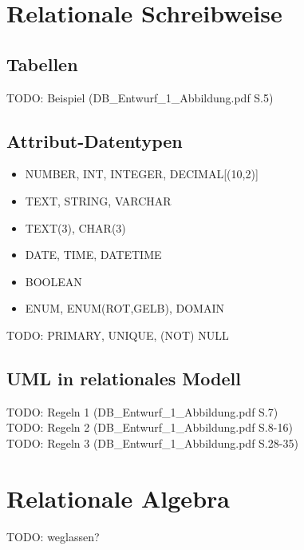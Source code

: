 \section{Relationale Schreibweise}
\subsection{Tabellen}
TODO: Beispiel (DB\_Entwurf\_1\_Abbildung.pdf S.5)
\subsection{Attribut-Datentypen}
\begin{itemize}
  \item NUMBER, INT, INTEGER, DECIMAL[(10,2)]
  \item TEXT, STRING, VARCHAR
  \item TEXT(3), CHAR(3)
  \item DATE, TIME, DATETIME
  \item BOOLEAN
  \item ENUM, ENUM(ROT,GELB), DOMAIN
\end{itemize}
TODO: PRIMARY, UNIQUE, (NOT) NULL
\subsection{UML in relationales Modell}
TODO: Regeln 1 (DB\_Entwurf\_1\_Abbildung.pdf S.7) \\
TODO: Regeln 2 (DB\_Entwurf\_1\_Abbildung.pdf S.8-16) \\
TODO: Regeln 3 (DB\_Entwurf\_1\_Abbildung.pdf S.28-35) \\

\section{Relationale Algebra}
TODO: weglassen?

